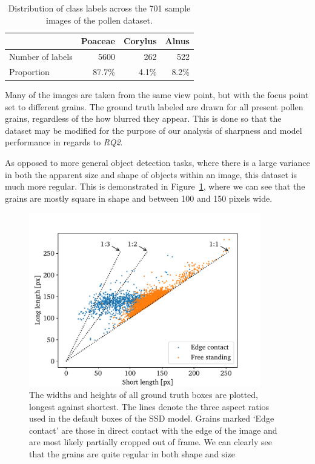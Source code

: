 \begin{table}[htb]
  \caption[Class distribution across the dataset]{Distribution of class labels across the 701 sample images of the pollen dataset.}\label{tab:dataset}
  \centering 
  \begin{tabular}{lrrr} \toprule
                      & Poaceae & Corylus & Alnus \\ \midrule
    Number of labels  & 5600    & 262     & 522 \\
    Proportion        & 87.7\%  & 4.1\%   & 8.2\% \\ \bottomrule
  \end{tabular}
\end{table}


Many of the images are taken from the same view point, but with the focus point set to different grains. The ground truth labeled are drawn for all present pollen grains, regardless of the how blurred they appear. This is done so that the dataset may be modified for the purpose of our analysis of sharpness and model performance in regards to \textit{RQ2}.

As opposed to more general object detection tasks, where there is a large variance in both the apparent size and shape of objects within an image, this dataset is much more regular. This is demonstrated in Figure~\ref{fig:aspect}, where we can see that the grains are mostly square in shape and between 100 and 150 pixels wide.

\begin{figure}[htb]
  \centering
  \includegraphics[width=0.9\textwidth]{figs/aspect_ratio.pdf}
  \caption[Aspect ratios in the dataset]{The widths and heights of all ground truth boxes are plotted, longest against shortest. The lines denote the three aspect ratios used in the default boxes of the SSD model. Grains marked `Edge contact' are those in direct contact with the edge of the image and are most likely partially cropped out of frame. We can clearly see that the grains are quite regular in both shape and size}\label{fig:aspect}
\end{figure}

